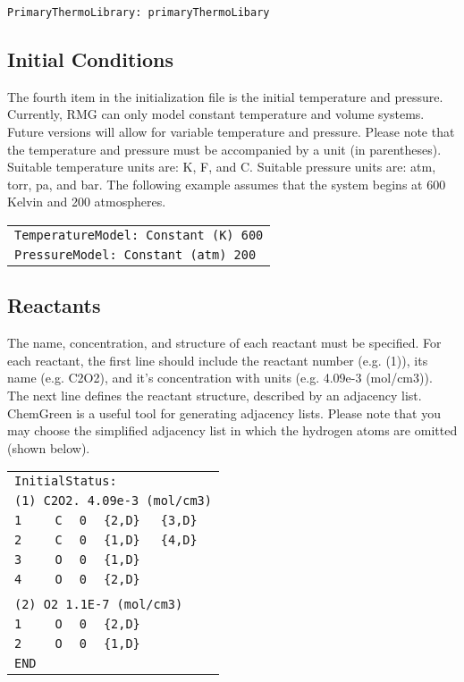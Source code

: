 \documentclass[12pt,letterpaper]{article}
\begin{document}
\texttt{PrimaryThermoLibrary: primaryThermoLibary}

\subsection{Initial Conditions}

The fourth item in the initialization file is the initial temperature and pressure.
Currently, RMG can only model constant temperature and volume
systems. Future versions will allow for variable temperature and pressure.
Please note that the temperature and pressure must be accompanied by a
unit (in parentheses). Suitable temperature units are: K, F, and C. Suitable
pressure units are: atm, torr, pa, and bar. The following example assumes
that the system begins at 600 Kelvin and 200 atmospheres. \\

\begin{tabular}{l}
\texttt{TemperatureModel: Constant (K) 600} \\
\texttt{PressureModel: Constant (atm) 200}
\end{tabular}

\subsection{Reactants}

The name, concentration, and structure of each reactant must be specified.
For each reactant, the first line should include the reactant number (e.g.
(1)), its name (e.g. C2O2), and it's concentration with units (e.g. 4.09e-3
(mol/cm3)). The next line defines the reactant structure, described by an
adjacency list. ChemGreen is a useful tool for generating adjacency lists.
Please note that you may choose the simplified adjacency list in which the
hydrogen atoms are omitted (shown below). \\


\begin{tabular}{lllll}
\multicolumn{5}{l}{\texttt{InitialStatus:}} \\
\multicolumn{5}{l}{\texttt{(1) C2O2. 4.09e-3 (mol/cm3)}} \\
\texttt{1}   & \texttt{C} & \texttt{0} & \texttt{\{2,D\}} & \texttt{\{3,D\} }\\
\texttt{2}   & \texttt{C} & \texttt{0} & \texttt{\{1,D\}} & \texttt{\{4,D\} } \\
\texttt{3}   & \texttt{O} & \texttt{0} & \texttt{\{1,D\}} &\\
\texttt{4}   & \texttt{O} & \texttt{0} & \texttt{\{2,D\}} & \\
& & & & \\
\multicolumn{5}{l}{\texttt{(2) O2 1.1E-7 (mol/cm3) }}\\
\texttt{1} & \texttt{O} & \texttt{0} & \texttt{\{2,D\}} & \\
\texttt{2} & \texttt{O} & \texttt{0} & \texttt{\{1,D\}} & \\
\texttt{END} \\
\end{tabular} \\
\end{document}
